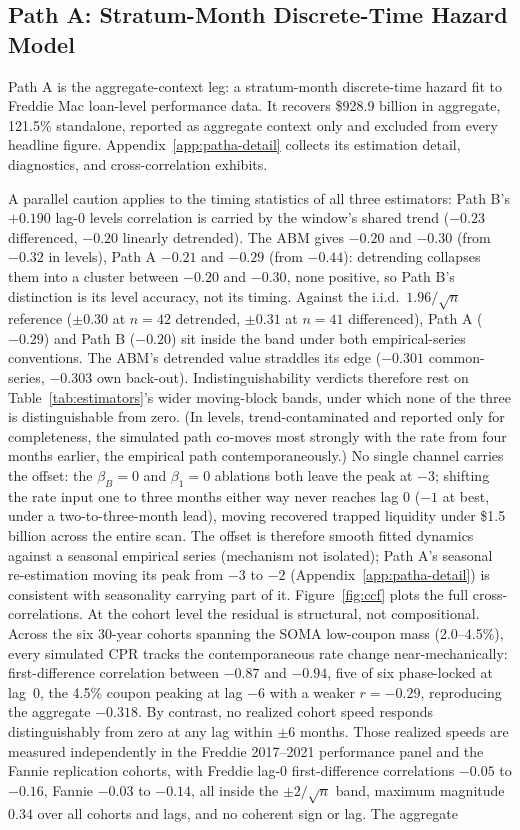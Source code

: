 \documentclass[12pt]{article}
\begin{document}
\subsection{Path A: Stratum-Month Discrete-Time Hazard Model}\label{sec:patha}

Path A is the aggregate-context leg: a stratum-month discrete-time hazard fit to Freddie Mac loan-level performance data. It recovers \$928.9 billion in aggregate, 121.5\% standalone, reported as aggregate context only and excluded from every headline figure. Appendix~\ref{app:patha-detail} collects its estimation detail, diagnostics, and cross-correlation exhibits.

A parallel caution applies to the timing statistics of all three estimators: Path B's $+0.190$ lag-0 levels correlation is carried by the window's shared trend ($-0.23$ differenced, $-0.20$ linearly detrended). The ABM gives $-0.20$ and $-0.30$ (from $-0.32$ in levels), Path A $-0.21$ and $-0.29$ (from $-0.44$): detrending collapses them into a cluster between $-0.20$ and $-0.30$, none positive, so Path B's distinction is its level accuracy, not its timing. Against the i.i.d.\ $1.96/\sqrt{n}$ reference ($\pm 0.30$ at $n = 42$ detrended, $\pm 0.31$ at $n = 41$ differenced), Path A ($-0.29$) and Path B ($-0.20$) sit inside the band under both empirical-series conventions. The ABM's detrended value straddles its edge ($-0.301$ common-series, $-0.303$ own back-out). Indistinguishability verdicts therefore rest on Table~\ref{tab:estimators}'s wider moving-block bands, under which none of the three is distinguishable from zero. (In levels, trend-contaminated and reported only for completeness, the simulated path co-moves most strongly with the rate from four months earlier, the empirical path contemporaneously.) No single channel carries the offset: the $\beta_B = 0$ and $\beta_1 = 0$ ablations both leave the peak at $-3$; shifting the rate input one to three months either way never reaches lag 0 ($-1$ at best, under a two-to-three-month lead), moving recovered trapped liquidity under \$1.5 billion across the entire scan. The offset is therefore smooth fitted dynamics against a seasonal empirical series (mechanism not isolated); Path A's seasonal re-estimation moving its peak from $-3$ to $-2$ (Appendix~\ref{app:patha-detail}) is consistent with seasonality carrying part of it. Figure~\ref{fig:ccf} plots the full cross-correlations. At the cohort level the residual is structural, not compositional. Across the six 30-year cohorts spanning the SOMA low-coupon mass (2.0--4.5\%), every simulated CPR tracks the contemporaneous rate change near-mechanically: first-difference correlation between $-0.87$ and $-0.94$, five of six phase-locked at lag~0, the 4.5\% coupon peaking at lag $-6$ with a weaker $r=-0.29$, reproducing the aggregate $-0.318$. By contrast, no realized cohort speed responds distinguishably from zero at any lag within $\pm 6$ months. Those realized speeds are measured independently in the Freddie 2017--2021 performance panel and the Fannie replication cohorts, with Freddie lag-0 first-difference correlations $-0.05$ to $-0.16$, Fannie $-0.03$ to $-0.14$, all inside the $\pm 2/\sqrt{n}$ band, maximum magnitude $0.34$ over all cohorts and lags, and no coherent sign or lag. The aggregate 
\end{document}
